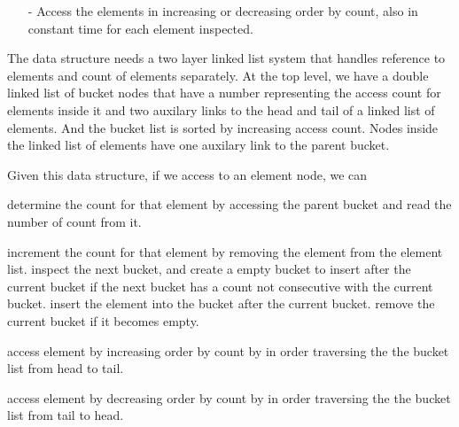 \documentclass[12pt]{article}
\begin{document}
\begin{enumerate}
\begin{itemize}
\item[-] Access the elements in increasing or decreasing order by count, also in constant time for each element inspected.

\end{itemize}

The data structure needs a two layer linked list system that handles reference to elements and count of elements separately. At the top level, we have a double linked list of bucket nodes that have a number representing the access count for elements inside it and two auxilary links to the head and tail of a linked list of elements. And the bucket list is sorted by increasing access count. Nodes inside the linked list of elements have one auxilary link to the parent bucket.

Given this data structure, if we access to an element node, we can

determine the count for that element by accessing the parent bucket and read the number of count from it.

increment the count for that element by removing the element from the element list. inspect the next bucket, and create a empty bucket to insert after the current bucket if the next bucket has a count not consecutive with the current bucket. insert the element into the bucket after the current bucket. remove the current bucket if it becomes empty.

access element by increasing order by count by in order traversing the the bucket list from head to tail.

access element by decreasing order by count by in order traversing the the bucket list from tail to head.

\end{enumerate}
\end{document}
